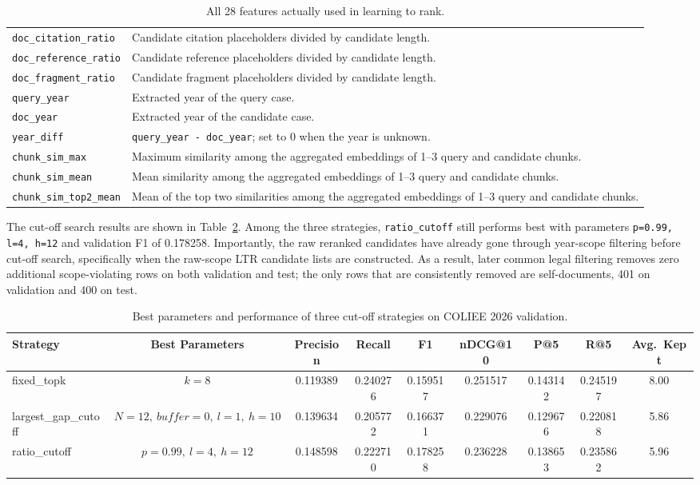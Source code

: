 \begin{table}[t]
\begin{tabular}{lp{}}
    \texttt{doc\_citation\_ratio} & Candidate citation placeholders divided by candidate length. \\
    \texttt{doc\_reference\_ratio} & Candidate reference placeholders divided by candidate length. \\
    \texttt{doc\_fragment\_ratio} & Candidate fragment placeholders divided by candidate length. \\
    \texttt{query\_year} & Extracted year of the query case. \\
    \texttt{doc\_year} & Extracted year of the candidate case. \\
    \texttt{year\_diff} & \texttt{query\_year - doc\_year}; set to 0 when the year is unknown. \\
    \texttt{chunk\_sim\_max} & Maximum similarity among the aggregated embeddings of 1--3 query and candidate chunks. \\
    \texttt{chunk\_sim\_mean} & Mean similarity among the aggregated embeddings of 1--3 query and candidate chunks. \\
    \texttt{chunk\_sim\_top2\_mean} & Mean of the top two similarities among the aggregated embeddings of 1--3 query and candidate chunks. \\
    \bottomrule
  \end{tabular}
  \caption{All 28 features actually used in learning to rank.}
  \label{tab:ltr-features}
\end{table}

The cut-off search results are shown in Table~\ref{tab:cutoff-strategies}. Among the three strategies, \texttt{ratio\_cutoff} still performs best with parameters \texttt{p=0.99, l=4, h=12} and validation F1 of 0.178258. Importantly, the raw reranked candidates have already gone through year-scope filtering before cut-off search, specifically when the raw-scope LTR candidate lists are constructed. As a result, later common legal filtering removes zero additional scope-violating rows on both validation and test; the only rows that are consistently removed are self-documents, 401 on validation and 400 on test.

\begin{table}[t]
  \centering
  \scriptsize
  \begin{tabular}{lcccccccc}
    \toprule
    Strategy & Best Parameters & Precision & Recall & F1 & nDCG@10 & P@5 & R@5 & Avg.\ Kept \\
    \midrule
    fixed\_topk & $k=8$ & 0.119389 & 0.240276 & 0.159517 & 0.251517 & 0.143142 & 0.245197 & 8.00 \\
    largest\_gap\_cutoff & $N=12,\ buffer=0,\ l=1,\ h=10$ & 0.139634 & 0.205772 & 0.166371 & 0.229076 & 0.129676 & 0.220818 & 5.86 \\
    ratio\_cutoff & $p=0.99,\ l=4,\ h=12$ & 0.148598 & 0.222710 & 0.178258 & 0.236228 & 0.138653 & 0.235862 & 5.96 \\
    \bottomrule
  \end{tabular}
  \caption{Best parameters and performance of three cut-off strategies on COLIEE 2026 validation.}
  \label{tab:cutoff-strategies}
\end{table}

